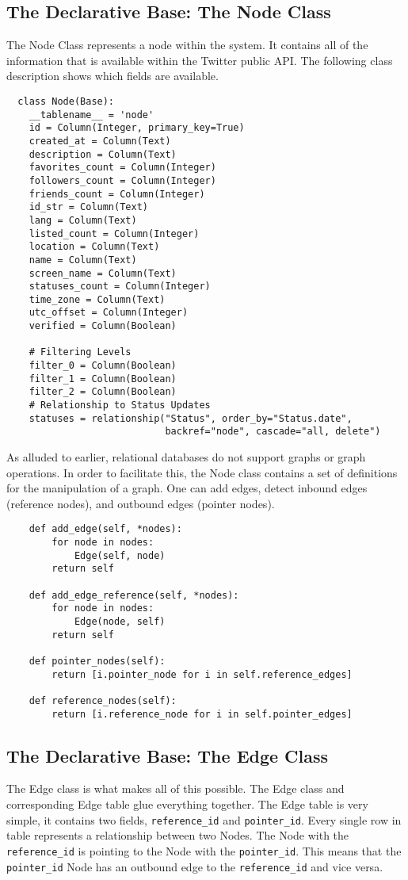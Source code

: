 \subsection{The Declarative Base: The Node Class}
The Node Class represents a node within the system. It contains all of the information that is available within the Twitter public API. The following class description shows which fields are available.

\begin{lstlisting}
  class Node(Base):
    __tablename__ = 'node'
    id = Column(Integer, primary_key=True)
    created_at = Column(Text)
    description = Column(Text)
    favorites_count = Column(Integer)
    followers_count = Column(Integer)
    friends_count = Column(Integer)
    id_str = Column(Text)
    lang = Column(Text)
    listed_count = Column(Integer)
    location = Column(Text)
    name = Column(Text)
    screen_name = Column(Text)
    statuses_count = Column(Integer)
    time_zone = Column(Text)
    utc_offset = Column(Integer)
    verified = Column(Boolean)

    # Filtering Levels
    filter_0 = Column(Boolean)
    filter_1 = Column(Boolean)
    filter_2 = Column(Boolean)
    # Relationship to Status Updates
    statuses = relationship("Status", order_by="Status.date",
                            backref="node", cascade="all, delete")
\end{lstlisting}

As alluded to earlier, relational databases do not support graphs or graph operations. In order to facilitate this, the Node class contains a set of definitions for the manipulation of a graph. One can add edges, detect inbound edges (reference nodes), and outbound edges (pointer nodes).

\begin{lstlisting}
    def add_edge(self, *nodes):
        for node in nodes:
            Edge(self, node)
        return self

    def add_edge_reference(self, *nodes):
        for node in nodes:
            Edge(node, self)
        return self

    def pointer_nodes(self):
        return [i.pointer_node for i in self.reference_edges]

    def reference_nodes(self):
        return [i.reference_node for i in self.pointer_edges]
\end{lstlisting}

\subsection{The Declarative Base: The Edge Class}
The Edge class is what makes all of this possible. The Edge class and corresponding Edge table glue everything together. The Edge table is very simple, it contains two fields, \verb|reference_id| and \verb|pointer_id|. Every single row in table represents a relationship between two Nodes. The Node with the \verb|reference_id| is pointing to the Node with the \verb|pointer_id|. This means that the \verb|pointer_id| Node has an outbound edge to the \verb|reference_id| and vice versa.

